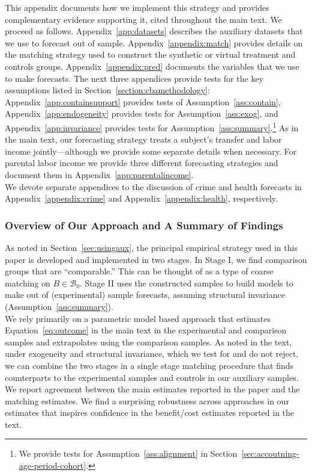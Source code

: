 \noindent This appendix documents how we implement this strategy and provides complementary evidence supporting it, cited throughout the main text. We proceed as follows. Appendix~\ref{app:datasets} describes the auxiliary datasets that we use to forecast out of sample. Appendix~\ref{appendix:match} provides details on the matching strategy used to construct the synthetic or virtual treatment and controls groups. Appendix~\ref{appendix:pred} documents the variables that we use to make forecasts. The next three appendices provide tests for the key assumptions listed in Section~\ref{section:cbamethodology}: Appendix~\ref{app:containsupport} provides tests of Assumption~\ref{ass:contain}, Appendix~\ref{app:endogeneity} provides tests for Assumption~\ref{ass:exog}, and Appendix~\ref{app:invariance} provides tests for Assumption~\ref{ass:summary}.\footnote{We provide tests for Assumption~\ref{ass:alignment} in Section~\ref{sec:accoutning-age-period-cohort}.} As in the main text, our forecasting strategy treats a subject's transfer and labor income jointly---although we provide some separate details when necessary. For parental labor income we provide three different forecasting strategies and document them in Appendix~\ref{app:parentalincome}.\\

\noindent We devote separate appendices to the discussion of crime and health forecasts in Appendix~\ref{appendix:crime} and Appendix~\ref{appendix:health}, respectively.

\subsubsection{Overview of Our Approach and A Summary of Findings}

\noindent As noted in Section~\ref{sec:usingaux}, the principal empirical strategy used in this paper is developed and implemented in two stages. In Stage I, we find comparison groups that are ``comparable.'' This can be thought of as a type of coarse matching on $B \in \mathcal{B}_0$. Stage II uses the constructed samples to build models to make out of (experimental) sample forecasts, assuming structural invariance (Assumption~\ref{ass:summary}). \\

\noindent We rely primarily on a parametric model based approach that estimates Equation~\eqref{eq:outcome} in the main text in the experimental and comparison samples and extrapolates using the comparison samples. As noted in the text, under exogeneity and structural invariance, which we test for and do not reject, we can combine the two stages in a single stage matching procedure that finds counterparts to the experimental samples and controls in our auxiliary samples. We report agreement between the main estimates reported in the paper and the matching estimates. We find a surprising robustness across approaches in our estimates that inspires confidence in the benefit/cost estimates reported in the text.\\

